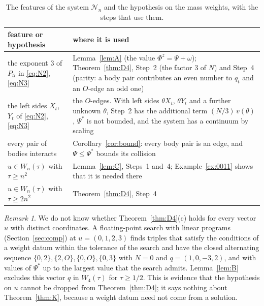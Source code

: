 \documentclass[11pt]{amsart}
\theoremstyle{definition}
\theoremstyle{remark}
\newtheorem{remark}[theorem]{Remark}
\numberwithin{equation}{section}
\newcommand{\cN}{\mathcal{N}}
\newcommand{\Ps}{\Psi^{*}}
\begin{document}
\begin{table}[ht]
\caption{The features of the system $\cN_n$ and the hypothesis on the mass weights, with the steps that
use them.}\label{tab:hyp}
\small
\begin{tabular}{@{}>{\raggedright}p{}>{\raggedright\arraybackslash}p{}@{}}
\toprule
feature or hypothesis & where it is used \\
\midrule
the exponent $3$ of $P_{tl}$ in \eqref{eq:N2}, \eqref{eq:N3} & Lemma~\ref{lem:A} (the value $\Phi^z = \Psi + \omega$); Theorem~\ref{thm:D4}, Step~2 (the factor $3$ of $N$) and Step~4 (parity: a body pair contributes an even number to $q_t$ and an $O$-edge an odd one) \\
the left sides $X_t$, $Y_t$ of \eqref{eq:N2}, \eqref{eq:N3} & the $O$-edges. With left sides $\theta X_t$, $\theta Y_t$ and a further unknown $\theta$, Step~2 has the additional term $(N/3)\, v(\theta)$, $\Ps$ is not bounded, and the system has a continuum by scaling \\
every pair of bodies interacts & Corollary~\ref{cor:bound}: every body pair is an edge, and $\Psi \le \Ps$ bounds its collision \\
$u \in W_n(\tau)$ with $\tau \ge n^2$ & Lemma~\ref{lem:C}, Steps~1 and~4; Example~\ref{ex:0011} shows that it is needed there \\
$u \in W_n(\tau)$ with $\tau \ge 2n^2$ & Theorem~\ref{thm:D4}, Step~4 \\
\bottomrule
\end{tabular}
\end{table}

\begin{remark}\label{rem:u0123}
We do not know whether Theorem~\ref{thm:D4}(c) holds for every vector $u$ with distinct coordinates. A
floating-point search with linear programs (Section~\ref{sec:comp}) at $u = (0, 1, 2, 3)$ finds triples
that satisfy the conditions of a weight datum within the tolerance of the search and have the closed
alternating sequence
$\{0, 2\}, \{2, O\}, \{0, O\}, \{0, 3\}$ with $N = 0$ and $q = (1, 0, -3, 2)$, and with values of $\Ps$
up to the largest value that the search admits. Lemma~\ref{lem:B} excludes this vector $q$ in $W_4(\tau)$ for
$\tau \ge 1/2$. This is evidence that the hypothesis on $u$ cannot be dropped from
Theorem~\ref{thm:D4}; it says nothing about Theorem~\ref{thm:K}, because a weight datum need not come
from a solution.
\end{remark}
\end{document}
